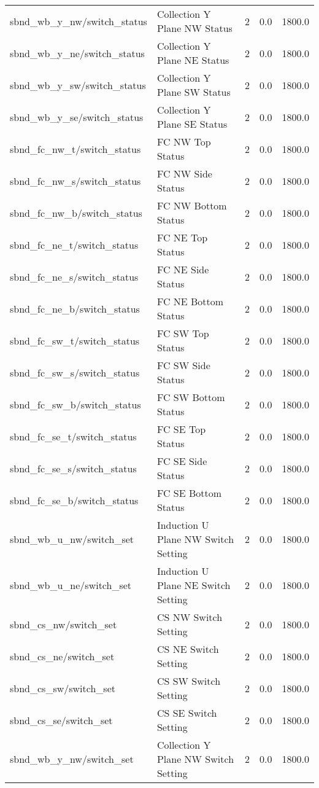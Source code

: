 \begin{center}
\begin{longtable}{l | l l l l }
sbnd\_wb\_y\_nw/switch\_status & Collection Y Plane NW Status & 2 & 0.0 & 1800.0\\ 
sbnd\_wb\_y\_ne/switch\_status & Collection Y Plane NE Status & 2 & 0.0 & 1800.0\\ 
sbnd\_wb\_y\_sw/switch\_status & Collection Y Plane SW Status & 2 & 0.0 & 1800.0\\ 
sbnd\_wb\_y\_se/switch\_status & Collection Y Plane SE Status & 2 & 0.0 & 1800.0\\ 
sbnd\_fc\_nw\_t/switch\_status & FC NW Top Status & 2 & 0.0 & 1800.0\\ 
sbnd\_fc\_nw\_s/switch\_status & FC NW Side Status & 2 & 0.0 & 1800.0\\ 
sbnd\_fc\_nw\_b/switch\_status & FC NW Bottom Status & 2 & 0.0 & 1800.0\\ 
sbnd\_fc\_ne\_t/switch\_status & FC NE Top Status & 2 & 0.0 & 1800.0\\ 
sbnd\_fc\_ne\_s/switch\_status & FC NE Side Status & 2 & 0.0 & 1800.0\\ 
sbnd\_fc\_ne\_b/switch\_status & FC NE Bottom Status & 2 & 0.0 & 1800.0\\ 
sbnd\_fc\_sw\_t/switch\_status & FC SW Top Status & 2 & 0.0 & 1800.0\\ 
sbnd\_fc\_sw\_s/switch\_status & FC SW Side Status & 2 & 0.0 & 1800.0\\ 
sbnd\_fc\_sw\_b/switch\_status & FC SW Bottom Status & 2 & 0.0 & 1800.0\\ 
sbnd\_fc\_se\_t/switch\_status & FC SE Top Status & 2 & 0.0 & 1800.0\\ 
sbnd\_fc\_se\_s/switch\_status & FC SE Side Status & 2 & 0.0 & 1800.0\\ 
sbnd\_fc\_se\_b/switch\_status & FC SE Bottom Status & 2 & 0.0 & 1800.0\\ 
sbnd\_wb\_u\_nw/switch\_set & Induction U Plane NW Switch Setting & 2 & 0.0 & 1800.0\\ 
sbnd\_wb\_u\_ne/switch\_set & Induction U Plane NE Switch Setting & 2 & 0.0 & 1800.0\\ 
sbnd\_cs\_nw/switch\_set & CS NW Switch Setting & 2 & 0.0 & 1800.0\\ 
sbnd\_cs\_ne/switch\_set & CS NE Switch Setting & 2 & 0.0 & 1800.0\\ 
sbnd\_cs\_sw/switch\_set & CS SW Switch Setting & 2 & 0.0 & 1800.0\\ 
sbnd\_cs\_se/switch\_set & CS SE Switch Setting & 2 & 0.0 & 1800.0\\ 
sbnd\_wb\_y\_nw/switch\_set & Collection Y Plane NW Switch Setting & 2 & 0.0 & 1800.0\\ 

\end{longtable}
\end{center}
